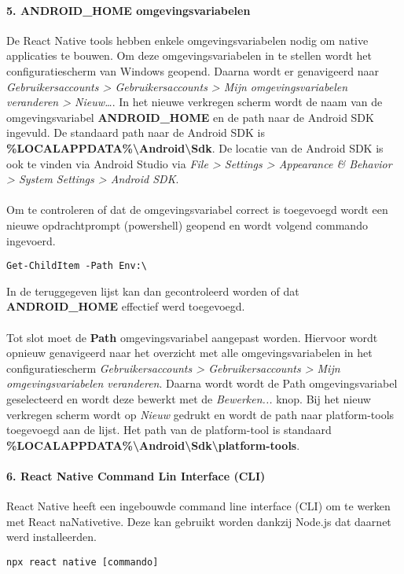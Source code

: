 \paragraph{5. ANDROID\_HOME omgevingsvariabelen}
De React Native tools hebben enkele omgevingsvariabelen nodig om native applicaties te bouwen. 
Om deze omgevingsvariabelen in te stellen wordt het configuratiescherm van Windows geopend. 
Daarna wordt er genavigeerd naar
\textit{Gebruikersaccounts > Gebruikersaccounts > Mijn omgevingsvariabelen veranderen > Nieuw\dots}. 
In het nieuwe verkregen scherm wordt de naam van de omgevingsvariabel \textbf{ANDROID\_HOME} 
en de path naar de Android SDK ingevuld. De standaard path naar de Android SDK is 
\textbf{\%LOCALAPPDATA\%\backslash Android\backslash Sdk}. 
De locatie van de Android SDK is ook te vinden via Android Studio via 
\textit{File > Settings > Appearance \& Behavior > System Settings > Android SDK}.
\\\\
Om te controleren of dat de omgevingsvariabel correct is toegevoegd wordt een nieuwe 
opdrachtprompt (powershell) geopend en wordt volgend commando ingevoerd.
\begin{verbatim}
Get-ChildItem -Path Env:\
\end{verbatim}
In de teruggegeven lijst kan dan gecontroleerd worden of dat \textbf{ANDROID\_HOME} effectief werd toegevoegd.
\\\\
Tot slot moet de \textbf{Path} omgevingsvariabel aangepast worden. 
Hiervoor wordt opnieuw genavigeerd naar het overzicht met alle omgevingsvariabelen in het configuratiescherm 
\textit{Gebruikersaccounts > Gebruikersaccounts > Mijn omgevingsvariabelen veranderen}. 
Daarna wordt wordt de Path omgevingsvariabel geselecteerd en wordt deze bewerkt met de \textit{Bewerken...} knop. 
Bij het nieuw verkregen scherm wordt op \textit{Nieuw} gedrukt en wordt de path naar platform-tools 
toegevoegd aan de lijst. Het path van de platform-tool is standaard 
\textbf{\%LOCALAPPDATA\%\backslash Android\backslash Sdk\backslash platform-tools}.

\paragraph{6. React Native Command Lin Interface (CLI)}
React Native heeft een ingebouwde command line interface (CLI) om te werken met React naNativetive. 
Deze kan gebruikt worden dankzij Node.js dat daarnet werd installeerden.
\begin{verbatim}
npx react native [commando]
\end{verbatim}

